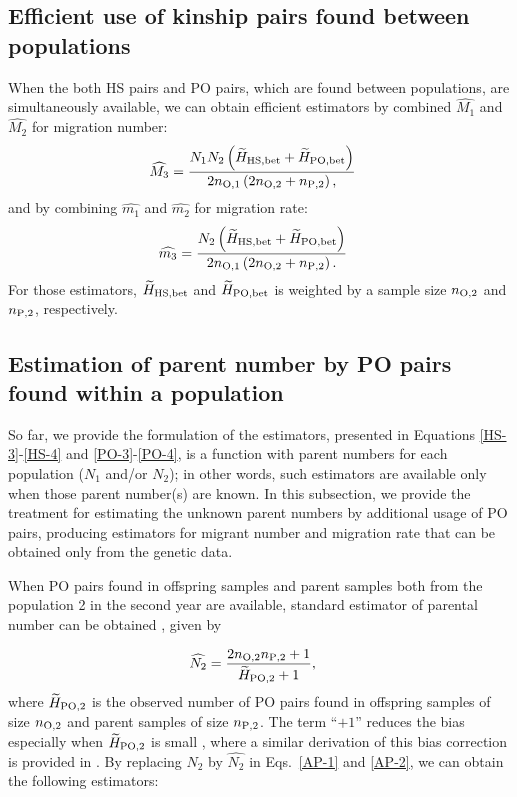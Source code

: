\documentclass[12pt, English]{article}
\begin{document}
\begin{spacing}{1.9}
\subsection{Efficient use of kinship pairs found between populations}

When the both HS pairs and PO pairs, which are found between populations, are simultaneously available, we can obtain efficient estimators by combined $\widehat{M_1}$ and $\widehat{M_2}$ for migration number: 
\begin{align}
\widehat{M_3} &= \frac{ N_{1} N_{2} \left(\widetilde{H}_{\rm HS,bet} + \widetilde{H}_{\rm PO,bet}\right) } {2n_{\rm O, 1} \left(2 n_{\rm O, 2} + n_{\rm P, 2}\right), }
\label{AP-1}
\end{align}
and by combining $\widehat{m_1}$ and $\widehat{m_2}$ for migration rate: 
\begin{align}
\widehat{m_3} &= \frac{ N_{2} \left(\widetilde{H}_{\rm HS,bet} + \widetilde{H}_{\rm PO,bet}\right) } {2n_{\rm O, 1} \left(2 n_{\rm O, 2} + n_{\rm P, 2}\right). }
\label{AP-2}
\end{align}
For those estimators, $\widetilde{H}_{\rm HS,bet}$ and $\widetilde{H}_{\rm PO,bet}$ is weighted by a sample size $n_{\rm O, 2}$ and $n_{\rm P, 2}$, respectively. 

\subsection{Estimation of parent number by PO pairs found within a population}

So far, we provide the formulation of the estimators, presented in Equations \ref{HS-3}-\ref{HS-4} and \ref{PO-3}-\ref{PO-4}, is a function with parent numbers for each population ($N_1$ and/or $N_2$); in other words, such estimators are available only when those parent number(s) are known. In this subsection, we provide the treatment for estimating the unknown parent numbers by additional usage of PO pairs, producing estimators for migrant number and migration rate that can be obtained only from the genetic data. 

When PO pairs found in offspring samples and parent samples both from the population 2 in the second year are available, standard estimator of parental number can be obtained \cite[]{bravington2016close}, given by

\begin{align}
\widehat{N_2} &= \frac{ 2 n_{\rm O, 2} n_{\rm P, 2} + 1 }{\widetilde{H}_{\rm PO, 2} + 1} ,
\label{AP-3}
\end{align}
where $\widetilde{H}_{\rm PO, 2}$ is the observed number of PO pairs found in offspring samples of size $n_{\rm O, 2}$ and parent samples of size $n_{\rm P, 2}$. The term ``$+1$'' reduces the bias especially when $\widetilde{H}_{\rm PO, 2}$ is small \cite[e.g.,][]{ecolevol2021p}, where a similar derivation of this bias correction is provided in \cite{Akita_2019}. By replacing $N_2$ by $\widehat{N_2}$ in Eqs.~\ref{AP-1} and \ref{AP-2}, we can obtain the following estimators: 


\end{spacing}
\end{document}
